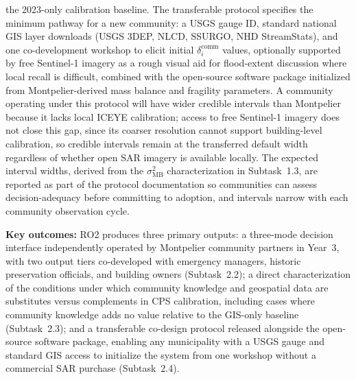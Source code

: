 \documentclass[11pt]{article}
\begin{document}
the 2023-only calibration baseline.
The transferable protocol specifies the minimum pathway for a new community:
a USGS gauge ID, standard national GIS layer downloads (USGS 3DEP, NLCD, SSURGO,
NHD StreamStats), and one co-development workshop to elicit initial
$\delta_i^{\mathrm{comm}}$ values, optionally supported by free Sentinel-1 imagery
as a rough visual aid for flood-extent discussion where local recall is difficult,
combined with the open-source software package
initialized from Montpelier-derived mass balance and fragility parameters.
A community operating under this protocol will have wider credible intervals than
Montpelier because it lacks local ICEYE calibration; access to free Sentinel-1
imagery does not close this gap, since its coarser resolution cannot support
building-level calibration, so credible intervals remain at the transferred
default width regardless of whether open SAR imagery is available locally.
The expected interval widths,
derived from the $\sigma_{\mathrm{MB}}^2$ characterization in Subtask~1.3, are
reported as part of the protocol documentation so communities can assess
decision-adequacy before committing to adoption, and intervals narrow with each
community observation cycle.

\textbf{Key outcomes:} RO2 produces three primary outputs: a three-mode decision
interface independently operated by Montpelier community partners in Year~3, with
two output tiers co-developed with emergency managers, historic preservation
officials, and building owners (Subtask~2.2); a direct characterization of the
conditions under which community knowledge and geospatial data are substitutes
versus complements in CPS calibration, including cases where community knowledge
adds no value relative to the GIS-only baseline (Subtask~2.3); and a transferable
co-design protocol released alongside the open-source software package, enabling
any municipality with a USGS gauge and standard GIS access to initialize the system
from one workshop without a commercial SAR purchase (Subtask~2.4).
\end{document}
